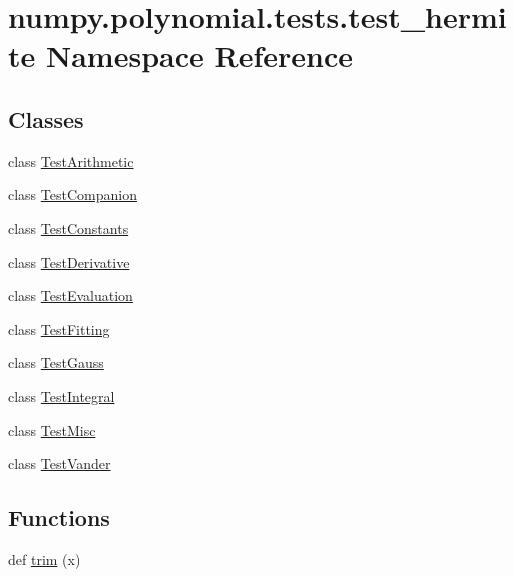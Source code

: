 \hypertarget{namespacenumpy_1_1polynomial_1_1tests_1_1test__hermite}{}\section{numpy.\+polynomial.\+tests.\+test\+\_\+hermite Namespace Reference}
\label{namespacenumpy_1_1polynomial_1_1tests_1_1test__hermite}
\subsection*{Classes}
\begin{DoxyCompactItemize}
\item 
class \hyperlink{classnumpy_1_1polynomial_1_1tests_1_1test__hermite_1_1TestArithmetic}{Test\+Arithmetic}
\item 
class \hyperlink{classnumpy_1_1polynomial_1_1tests_1_1test__hermite_1_1TestCompanion}{Test\+Companion}
\item 
class \hyperlink{classnumpy_1_1polynomial_1_1tests_1_1test__hermite_1_1TestConstants}{Test\+Constants}
\item 
class \hyperlink{classnumpy_1_1polynomial_1_1tests_1_1test__hermite_1_1TestDerivative}{Test\+Derivative}
\item 
class \hyperlink{classnumpy_1_1polynomial_1_1tests_1_1test__hermite_1_1TestEvaluation}{Test\+Evaluation}
\item 
class \hyperlink{classnumpy_1_1polynomial_1_1tests_1_1test__hermite_1_1TestFitting}{Test\+Fitting}
\item 
class \hyperlink{classnumpy_1_1polynomial_1_1tests_1_1test__hermite_1_1TestGauss}{Test\+Gauss}
\item 
class \hyperlink{classnumpy_1_1polynomial_1_1tests_1_1test__hermite_1_1TestIntegral}{Test\+Integral}
\item 
class \hyperlink{classnumpy_1_1polynomial_1_1tests_1_1test__hermite_1_1TestMisc}{Test\+Misc}
\item 
class \hyperlink{classnumpy_1_1polynomial_1_1tests_1_1test__hermite_1_1TestVander}{Test\+Vander}
\end{DoxyCompactItemize}
\subsection*{Functions}
\begin{DoxyCompactItemize}
\item 
def \hyperlink{namespacenumpy_1_1polynomial_1_1tests_1_1test__hermite_a3535069b86529b44e2e10ced60b692be}{trim} (x)
\end{DoxyCompactItemize}
